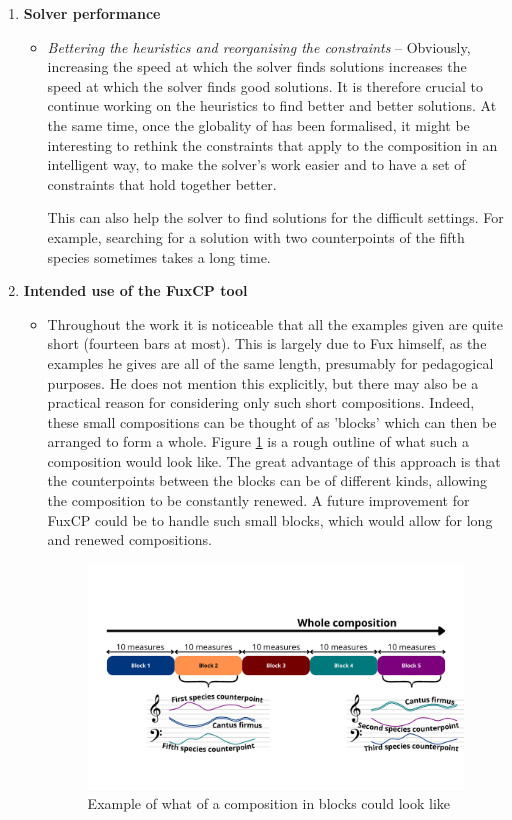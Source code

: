 \begin{enumerate}
  \item \textbf{Solver performance}
  \begin{itemize}
    \item \textit{Bettering the heuristics and reorganising the constraints} -- Obviously, increasing the speed at which the solver finds solutions increases the speed at which the solver finds good solutions. It is therefore crucial to continue working on the heuristics to find better and better solutions. At the same time, once the globality of \gaps has been formalised, it might be interesting to rethink the constraints that apply to the composition in an intelligent way, to make the solver's work easier and to have a set of constraints that hold together better.
    
    This can also help the solver to find solutions for the difficult settings. For example, searching for a solution with two counterpoints of the fifth species sometimes takes a long time. 
  \end{itemize}

  \item \textbf{Intended use of the FuxCP tool}
  \begin{itemize}
    \item   Throughout the work it is noticeable that all the examples given are quite short (fourteen bars at most). This is largely due to Fux himself, as the examples he gives are all of the same length, presumably for pedagogical purposes. He does not mention this explicitly, but there may also be a practical reason for considering only such short compositions. Indeed, these small compositions can be thought of as 'blocks' which can then be arranged to form a whole. Figure \ref{fig:composition-in-blocks} is a rough outline of what such a composition would look like. The great advantage of this approach is that the counterpoints between the blocks can be of different kinds, allowing the composition to be constantly renewed. A future improvement for FuxCP could be to handle such small blocks, which would allow for long and renewed compositions.
  
    \begin{figure}[h]
      \centering
      \includegraphics[width=5.2in]{Images/composition-in-blocks.png}
      \caption{Example of what of a composition in blocks could look like}
      \label{fig:composition-in-blocks}
    \end{figure}
  \end{itemize}
\end{enumerate}